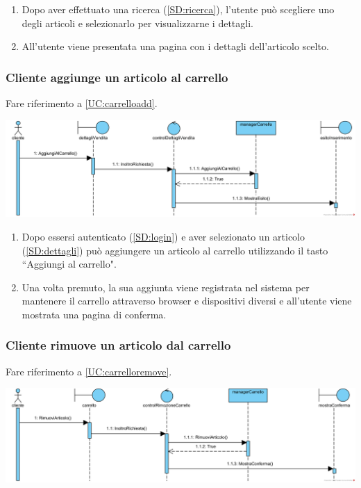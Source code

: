 \documentclass[12pt,a4paper]{article}
\begin{document}
\begin{enumerate}
\item Dopo aver effettuato una ricerca (\ref{SD:ricerca}), l'utente può scegliere uno degli articoli e selezionarlo per visualizzarne i dettagli.
\item All'utente viene presentata una pagina con i dettagli dell'articolo scelto.
\end{enumerate}

\newpage

\subsubsection{Cliente aggiunge un articolo al carrello}
\label{SD:aggiunta}

Fare riferimento a \ref{UC:carrelloadd}. \\

\begin{center}
\includegraphics[width=\textwidth]{SequenceDiagram/ClienteCarrelloAggiunge}
\end{center}

\begin{enumerate}
\item Dopo essersi autenticato (\ref{SD:login}) e aver selezionato un articolo (\ref{SD:dettagli}) può aggiungere un articolo al carrello utilizzando il tasto ``Aggiungi al carrello".
\item Una volta premuto, la sua aggiunta viene registrata nel sistema per mantenere il carrello attraverso browser e dispositivi diversi e all'utente viene mostrata una pagina di conferma.
\end{enumerate}

\subsubsection{Cliente rimuove un articolo dal carrello}
\label{SD:rimozione}

Fare riferimento a \ref{UC:carrelloremove}. \\

\begin{center}
\includegraphics[width=\textwidth]{SequenceDiagram/ClienteCarrelloRimuove}
\end{center}
\end{document}
